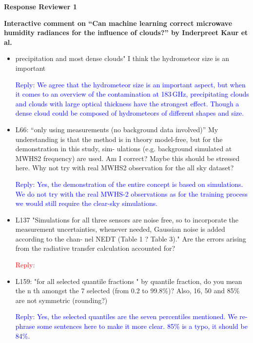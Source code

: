 \documentclass[11pt,a4paper,draft]{article}
\begin{document}
\textbf{Response Reviewer 1}
	
\textbf{	Interactive comment on ``Can machine learning
	correct microwave humidity radiances for the
	influence of clouds?'' by Inderpreet Kaur et al.}


\begin{itemize}

\item 	precipitation and most dense clouds" I think the hydrometeor size is an important
		
		
\textcolor{blue}{Reply: We agree that the hydrometeor size is an important aspect, but when it comes to an overview of the contamination at 183\,GHz, precipitating clouds and clouds with large optical thickness have the strongest effect. Though a dense cloud could be composed of hydrometeors of different shapes and size. }
		
		
\item	L66: ``only using measurements (no background data involved)'' My understanding is
		that the method is in theory model-free, but for the demonstration in this study, sim-
		ulations (e.g. background simulated at MWHS2 frequency) are used. Am I correct?
		Maybe this should be stressed here. Why not try with real MWHS2 observation for the
		all sky dataset?
		
\textcolor{blue}{Reply: Yes, the demonstration of the entire concept is based on simulations. We do not try with the real MWHS-2 observations as for the training process we would still require the clear-sky simulations.} 
		
		
\item
		L137 "Simulations for all three sensors are noise free, so to incorporate the measurement uncertainties, whenever needed, Gaussian noise is added according to the chan-
		nel NEDT (Table 1 ? Table 3)." Are the errors arising from the radiative transfer calculation accounted for?
		
\textcolor{red}{Reply: } 
		
		
		
\item	
		L159: "for all selected quantile fractions " by quantile fraction, do you mean the n th
		amongst the 7 selected (from 0.2 to 99.8\%)? Also, 16, 50 and 85\% are not symmetric
		(rounding?)
		
\textcolor{blue}{Reply: Yes, the selected quantiles are the seven percentiles mentioned. We re-phrase some sentences here to make it more clear. 85\% is a typo, it should be 84\%. }
		

\end{itemize}
\end{document}
